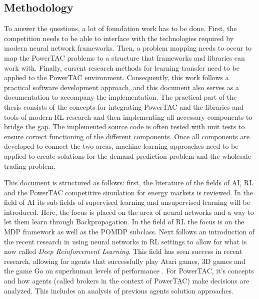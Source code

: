 \subsection{Methodology}
\label{sec:methodology}
To answer the questions, a lot of foundation work has to be done. First, the competition needs to be able to interface
with the technologies required by modern neural network frameworks. Then,  a problem mapping needs to occur to map the
\ac{PowerTAC} problems to a structure that frameworks and libraries can work with. Finally, current research methods for
learning transfer need to be applied to the \ac{PowerTAC} environment. Consequently, this work follows a practical
software development approach, and this document also serves as a documentation to accompany the implementation. The
practical part of the thesis consists of the concepts for integrating \ac{PowerTAC} and the libraries and tools of
modern \ac{RL} research and then implementing all necessary components to bridge the gap. The implemented source code is
often tested with unit tests to ensure correct functioning of the different components. Once all components are
developed to connect the two areas, machine learning approaches need to be applied to create solutions for the demand
prediction problem and the wholesale trading problem. 

This document is structured as follows: first, the literature of the fields of \ac{AI}, \ac{RL} and the \ac{PowerTAC}
competitive simulation for energy markets is reviewed. In the field of AI its sub fields of supervised learning and
unsupervised learning will be introduced. Here, the focus is placed on the area of neural networks and a way to let them
learn through Backpropagation. In the field of \ac{RL} the focus is on the \ac{MDP} framework as well as the \ac{POMDP}
subclass.  Next follows an introduction of the recent research in using neural networks in \ac{RL} settings to allow for
what is now called \emph{Deep Reinforcement Learning}. This field has seen success in recent research, allowing for
agents that successfully play Atari games, 3D games and the game Go on superhuman levels of performance
\citep{proximalpolicyopt, silver2016mastering}.  For \ac{PowerTAC}, it's concepts and how agents (called brokers in the
context of \ac{PowerTAC}) make decisions are analyzed. This includes an analysis of previous agents solution approaches.


